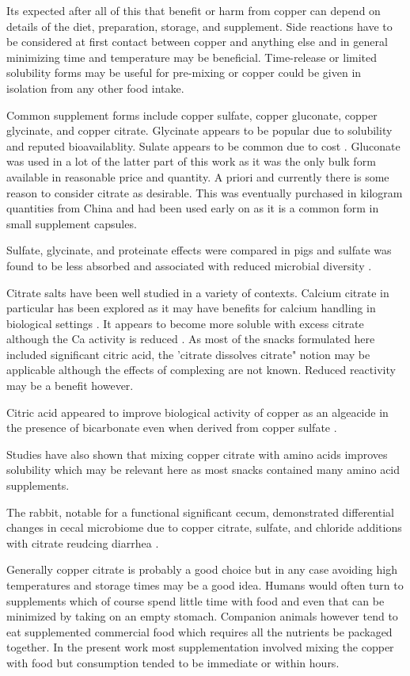 Its expected after all of this that benefit or harm from
copper can depend on details of the diet, preparation, storage, and
supplement. Side reactions have to be considered at first contact
between copper and anything else and in general minimizing time
and temperature may be beneficial.  Time-release or limited
solubility forms may be useful for pre-mixing or copper could be
given in isolation from any other food intake.

Common supplement forms include copper sulfate, copper gluconate,
copper glycinate, and copper citrate.  Glycinate appears to be popular
due to solubility and reputed bioavailablity. Sulate appears to be
common due to cost \cite{Wu_Tan_Shi_vitro_bioaccessibility_2024}. 
Gluconate was used in a lot of the latter
part of this work as it was the only bulk form available in 
reasonable price and quantity. A priori and currently there is some
reason to consider citrate as desirable. This was eventually
purchased in kilogram quantities from China and had been used
early on as it is a common form in small supplement capsules.

Sulfate, glycinate, and proteinate effects were compared
in pigs and sulfate was found to be less absorbed and associated
with reduced microbial diversity \cite{PMC8718720}. 


Citrate salts have been well studied in a variety of contexts.
Calcium citrate in particular  has been explored as
it may have benefits for calcium handling in 
biological settings 
\cite{Liu_Skibsted_Citrate_calcium_transport_2023}.
It appears to become more soluble
with excess citrate although the Ca activity is reduced
\cite{Vavrusova_Skibsted_Aqueous_solubility_calcium_2016}.
As most of the snacks formulated here included significant
citric acid, the 'citrate dissolves citrate" notion may be
applicable although the effects of complexing are not 
known. Reduced reactivity may be a benefit however.

Citric acid appeared to improve biological activity
of copper as an algeacide in the presence of bicarbonate
even when derived from copper sulfate
\cite{Swader_Chan_Citric_acid_enhancement_1975}.

Studies have also shown that mixing copper citrate
with amino acids improves solubility
\cite{Sobel_Haigney_Kim_complexation_aqueous_}
which may be relevant here as most snacks contained
many amino acid supplements. 

The rabbit, notable for a functional significant cecum,
demonstrated differential changes in cecal microbiome
due to copper citrate, sulfate, and chloride additions
with citrate reudcing diarrhea \cite{10.3389/fvets.2023.1179374}.




Generally copper citrate is probably a good choice but in any
case avoiding high temperatures and storage times may be a good
idea. Humans would often turn to supplements which of course
spend little time with food and even that can be minimized
by taking on an empty stomach. Companion animals however
tend to eat supplemented commercial food which requires all the
nutrients be packaged together. In the present work most supplementation 
involved mixing the copper with food but consumption tended to 
be immediate or within hours.  
